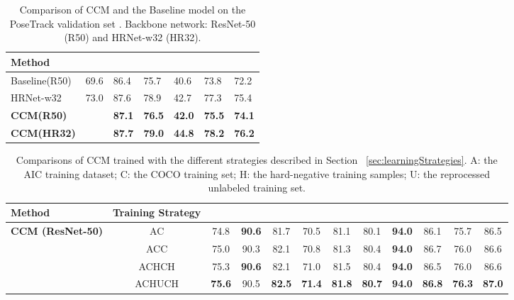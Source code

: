 \documentclass[twocolumn]{svjour3}          \smartqed  \usepackage{natbib}
\begin{document}
\begin{table}[htbp]
\centering
  \caption{Comparison of CCM and the Baseline model on the PoseTrack validation set \citep{Andriluka2018PoseTrack}. Backbone network: ResNet-50 (R50) and HRNet-w32 (HR32).}
\begin{tabular}{p{1.7cm}p{0.8cm}<{\centering}p{0.7cm}<{\centering}p{0.8cm}<{\centering}p{0.6cm}<{\centering}p{0.6cm}<{\centering}p{0.4cm}<{\centering}}
    \toprule
    Method    &     &   &   &    &  &  \\
    \midrule
    Baseline(R50)  & 69.6  & 86.4  & 75.7  & 40.6  & 73.8 & 72.2\\
    HRNet-w32 & 73.0  & 87.6  & 78.9  & 42.7  & 77.3 & 75.4\\
    \midrule
    \textbf{CCM(R50)} &   & \textbf{87.1}  & \textbf{76.5}  & \textbf{42.0}  & \textbf{75.5} & \textbf{74.1} \\
    \textbf{CCM(HR32)} &   & \textbf{87.7}  & \textbf{79.0}  & \textbf{44.8}  & \textbf{78.2} & \textbf{76.2} \\
    \bottomrule
    \end{tabular}\label{tab:posetrack}\end{table}

\begin{table*}[htbp]
\centering
  \caption{Comparisons of CCM trained with the different strategies described in Section ~\ref{sec:learningStrategies}. A: the AIC training dataset; C: the COCO training set; H: the hard-negative training samples; U: the reprocessed unlabeled training set.}
    \begin{tabular}{lccccccccccc}
\toprule
      Method  & Training Strategy  &     &   &   &    &    &  &   &  &  & \\
    \midrule
    \multicolumn{1}{c}{\multirow{4}[0]{*}{\textbf{CCM (ResNet-50)}}} & AC &  74.8  & \textbf{90.6}  & 81.7  & 70.5  & 81.1  & 80.1  & \textbf{94.0}  & 86.1  & 75.7  & 86.5\\
    \multicolumn{1}{c}{} & ACC &  75.0  & 90.3  & 82.1  & 70.8  & 81.3  & 80.4  & \textbf{94.0}  & 86.7  & 76.0  & 86.6  \\
    \multicolumn{1}{c}{} & ACHCH &   75.3  & \textbf{90.6}  & 82.1  & 71.0  & 81.5  & 80.4  & \textbf{94.0}  & 86.5  & 76.0  & 86.6  \\
    \multicolumn{1}{c}{} & ACHUCH &  \textbf{75.6}  & 90.5  & \textbf{82.5}  & \textbf{71.4}  & \textbf{81.8}  & \textbf{80.7}  & \textbf{94.0}  & \textbf{86.8}  & \textbf{76.3}  & \textbf{87.0}  \\
    \bottomrule
    \end{tabular}\label{tab:ablation_trainingStrategy}\end{table*}
\end{document}
